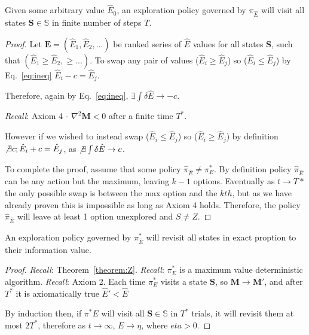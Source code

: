 \begin{theorem} \label{theorem:Z} 
	Given some arbitrary value $\hat E_0$, an exploration policy governed by $\pi_{\hat E}$ will visit all states $\mathbf{S} \in \mathbb{S}$ in finite number of steps $T$.
\end{theorem}
\begin{proof}
	Let $\mathbf{E} = (\hat E_1, \hat E_2, ...)$ be ranked series of $\hat E$ values for all states $\mathbf{S}$, such that $(\hat E_1 \geq \hat E_2, \geq ...)$. To swap any pair of values ($\hat E_i \geq \hat E_j$) so ($\hat E_i \leq \hat E_j$) by Eq.~\ref{eq:ineq} $\hat E_i - c = \hat E_j$. 
	
	Therefore, again by Eq.~\ref{eq:ineq}, $\exists \int \delta \hat E \rightarrow -c$. 
	
	\textit{Recall}: Axiom 4 - $\nabla^2 \mathbf{M} < 0$ after a finite time $T^*$.
	
	However if we wished to instead swap ($\hat E_i \leq \hat E_j$) so ($\hat E_i \geq \hat E_j$) by definition $\not \exists c; \hat E_i + c = \hat E_j$, as $\not \exists \int \delta \hat E \rightarrow c$. 
	
	To complete the proof, assume that some policy $\hat \pi_{\hat E} \neq \pi^*_E$. By definition policy $\hat \pi_{\hat E}$ can be any action but the maximum, leaving $k-1$ options. Eventually as $t \rightarrow T*$ the only possible swap is between the max option and the $kth$, but as we have already proven this is impossible as long as Axiom 4 holds. Therefore, the policy $\hat \pi_{\hat E}$ will leave at least 1 option unexplored and $S \neq Z$. 
\end{proof}

\begin{theorem}[[Efficient exploration] \label{theorem:convergence} 
	An exploration policy governed by $\pi^*_{\hat E}$ will revisit all states in exact proption to their information value.
\end{theorem}
\begin{proof}
    \textit{Recall}: Theorem~\ref{theorem:Z}.
    \textit{Recall}: $\pi^*_E$ is a maximum value deterministic algorithm.
	\textit{Recall}: Axiom 2. Each time $\pi^*_E$ visits a state $\mathbf{S}$, so $\mathbf{M} \rightarrow \mathbf{M}'$, and after $T^*$ it is axiomatically true $\hat{E}' < \hat E$
	
	By induction then, if $\pi^*E$ will visit all $\mathbf{S} \in \mathbb{S}$ in $T^*$ trials, it will revisit them at most $2T^*$, therefore as $t \rightarrow \infty$, $E \rightarrow \eta$, where $eta > 0$. 
\end{proof}

